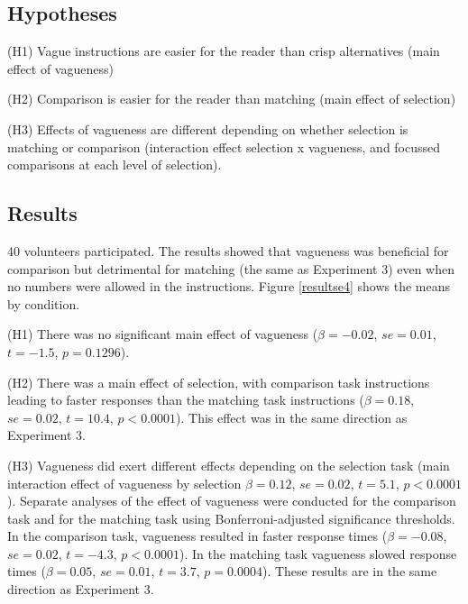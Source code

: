 \documentclass[%
man,		%
floatsintext,%
apacite%
]{apa6}
\begin{document}
\subsection{Hypotheses}%
\begin{APAenumerate}
	\item [(H1)] Vague instructions are easier for the reader than crisp alternatives (main effect of vagueness)
	\item [(H2)] Comparison is easier for the reader than matching (main effect of selection)
	\item [(H3)] Effects of vagueness are different depending on whether selection is matching or comparison (interaction effect selection x vagueness, and focussed comparisons at each level of selection).
\end{APAenumerate}

\subsection{Results}%
40 volunteers participated.
The results showed that vagueness was beneficial for comparison but detrimental for matching (the same as Experiment 3) even when no numbers were allowed in the instructions. 
Figure \ref{resultse4} shows the means by condition. 

\begin{APAenumerate}
	\item [(H1)] There was no significant main effect of vagueness ($\beta=-0.02$, $se=0.01$, $t=-1.5$, $p=0.1296$). 
	\item [(H2)] There was a main effect of selection, with comparison task instructions leading to faster responses than the matching task instructions ($\beta=0.18$, $se=0.02$, $t=10.4$, $p<0.0001$).  This effect was in the same direction as Experiment 3. 
	\item[(H3)] Vagueness did exert different effects depending on the selection task (main interaction effect of vagueness by selection $\beta=0.12$, $se=0.02$, $t=5.1$, $p<0.0001$). 
Separate analyses of the effect of vagueness were conducted for the comparison task and for the matching task using Bonferroni-adjusted significance thresholds. 
In the comparison task, vagueness resulted in faster response times ($\beta=-0.08$, $se=0.02$, $t=-4.3$, $p<0.0001$). 
In the matching task vagueness slowed response times ($\beta=0.05$, $se=0.01$, $t=3.7$, $p=0.0004$). 
These results are in the same direction as Experiment 3.
\end{APAenumerate}
\end{document}
